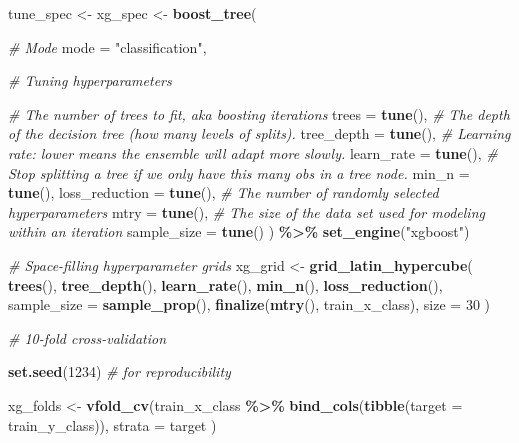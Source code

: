 \documentclass[
]{book}
\newenvironment{Shaded}{\begin{snugshade}}{\end{snugshade}}
\newcommand{\AttributeTok}[1]{\textcolor[rgb]{0.13,0.29,0.53}{#1}}
\newcommand{\CommentTok}[1]{\textcolor[rgb]{0.56,0.35,0.01}{\textit{#1}}}
\newcommand{\DecValTok}[1]{\textcolor[rgb]{0.00,0.00,0.81}{#1}}
\newcommand{\FunctionTok}[1]{\textcolor[rgb]{0.13,0.29,0.53}{\textbf{#1}}}
\newcommand{\NormalTok}[1]{#1}
\newcommand{\OtherTok}[1]{\textcolor[rgb]{0.56,0.35,0.01}{#1}}
\newcommand{\SpecialCharTok}[1]{\textcolor[rgb]{0.81,0.36,0.00}{\textbf{#1}}}
\newcommand{\StringTok}[1]{\textcolor[rgb]{0.31,0.60,0.02}{#1}}
\begin{document}
\begin{Shaded}
\begin{Highlighting}[]
\NormalTok{tune\_spec }\OtherTok{\textless{}{-}}
\NormalTok{  xg\_spec }\OtherTok{\textless{}{-}} \FunctionTok{boost\_tree}\NormalTok{(}

    \CommentTok{\# Mode}
    \AttributeTok{mode =} \StringTok{"classification"}\NormalTok{,}

    \CommentTok{\# Tuning hyperparameters}

    \CommentTok{\# The number of trees to fit, aka boosting iterations}
    \AttributeTok{trees =} \FunctionTok{tune}\NormalTok{(),}
    \CommentTok{\# The depth of the decision tree (how many levels of splits).}
    \AttributeTok{tree\_depth =} \FunctionTok{tune}\NormalTok{(),}
    \CommentTok{\# Learning rate: lower means the ensemble will adapt more slowly.}
    \AttributeTok{learn\_rate =} \FunctionTok{tune}\NormalTok{(),}
    \CommentTok{\# Stop splitting a tree if we only have this many obs in a tree node.}
    \AttributeTok{min\_n =} \FunctionTok{tune}\NormalTok{(),}
    \AttributeTok{loss\_reduction =} \FunctionTok{tune}\NormalTok{(),}
    \CommentTok{\# The number of randomly selected hyperparameters}
    \AttributeTok{mtry =} \FunctionTok{tune}\NormalTok{(),}
    \CommentTok{\# The size of the data set used for modeling within an iteration}
    \AttributeTok{sample\_size =} \FunctionTok{tune}\NormalTok{()}
\NormalTok{  ) }\SpecialCharTok{\%\textgreater{}\%}
  \FunctionTok{set\_engine}\NormalTok{(}\StringTok{"xgboost"}\NormalTok{)}

\CommentTok{\# Space{-}filling hyperparameter grids}
\NormalTok{xg\_grid }\OtherTok{\textless{}{-}} \FunctionTok{grid\_latin\_hypercube}\NormalTok{(}
  \FunctionTok{trees}\NormalTok{(),}
  \FunctionTok{tree\_depth}\NormalTok{(),}
  \FunctionTok{learn\_rate}\NormalTok{(),}
  \FunctionTok{min\_n}\NormalTok{(),}
  \FunctionTok{loss\_reduction}\NormalTok{(),}
  \AttributeTok{sample\_size =} \FunctionTok{sample\_prop}\NormalTok{(),}
  \FunctionTok{finalize}\NormalTok{(}\FunctionTok{mtry}\NormalTok{(), train\_x\_class),}
  \AttributeTok{size =} \DecValTok{30}
\NormalTok{)}

\CommentTok{\# 10{-}fold cross{-}validation}

\FunctionTok{set.seed}\NormalTok{(}\DecValTok{1234}\NormalTok{) }\CommentTok{\# for reproducibility}

\NormalTok{xg\_folds }\OtherTok{\textless{}{-}} \FunctionTok{vfold\_cv}\NormalTok{(train\_x\_class }\SpecialCharTok{\%\textgreater{}\%} \FunctionTok{bind\_cols}\NormalTok{(}\FunctionTok{tibble}\NormalTok{(}\AttributeTok{target =}\NormalTok{ train\_y\_class)),}
  \AttributeTok{strata =}\NormalTok{ target}
\NormalTok{)}
\end{Highlighting}
\end{Shaded}
\end{document}
